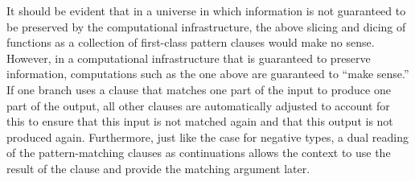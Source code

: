 \documentclass[preprint]{sigplanconf}
\begin{document}
It should be evident that in a universe in which information is not
guaranteed to be preserved by the computational infrastructure, the above
slicing and dicing of functions as a collection of first-class pattern
clauses would make no sense. However, in a computational infrastructure that
is guaranteed to preserve information, computations such as the one above are
guaranteed to ``make sense.'' If one branch uses a clause that matches one
part of the input to produce one part of the output, all other clauses are
automatically adjusted to account for this to ensure that this input is not
matched again and that this output is not produced again. Furthermore, just
like the case for negative types, a dual reading of the pattern-matching
clauses as continuations allows the context to use the result of the clause
and provide the matching argument later.
\end{document}
